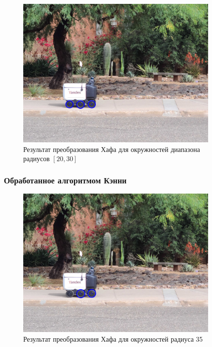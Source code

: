 
\begin{figure}[H]
    \centering
    \includegraphics[width=0.9\textwidth]{../outputs/image7_ordinary_r2030.png}
    \caption{Результат преобразования Хафа для окружностей диапазона радиусов $[20, 30]$}
\end{figure}

\subsubsection{Обработанное алгоритмом Кэнни}


\begin{figure}[H]
    \centering
    \includegraphics[width=0.9\textwidth]{../outputs/image7_canny_r35.png}
    \caption{Результат преобразования Хафа для окружностей радиуса 35}
\end{figure}

